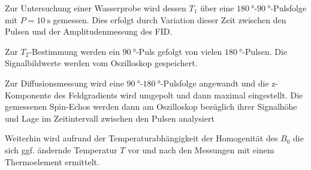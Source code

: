 Zur Untersuchung einer Wasserprobe wird dessen $T_1$ über eine $\SI{180}{\degree}$-$\SI{90}{\degree}$-Pulsfolge
mit $P = \SI{10}{\second}$ gemessen. Dies erfolgt durch Variation dieser Zeit zwischen den Pulsen
und der Amplitudenmessung des FID.

Zur $T_2$-Bestimmung werden ein $\SI{90}{\degree}$-Puls gefolgt von vielen $\SI{180}{\degree}$-Pulsen.
Die Signalbildwerte werden vom Oszilloskop gespeichert.

Zur Diffusionsmessung wird eine $\SI{90}{\degree}$-$\SI{180}{\degree}$-Pulsfolge angewandt
und die z-Komponente des Feldgradients wird umgepolt und dann maximal eingestellt.
Die gemessenen Spin-Echos werden dann am Oszilloskop bezüglich ihrer Signalhöhe und Lage im Zeitintervall 
zwischen den Pulsen analysiert

Weiterhin wird aufrund der Temperaturabhängigkeit der Homogenität des $B_0$ die sich ggf. 
ändernde Temperatur $T$ vor und nach den Messungen mit einem Thermoelement ermittelt.
